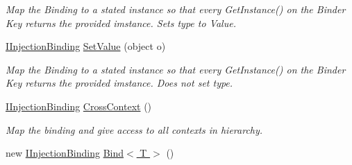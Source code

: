 \begin{DoxyCompactItemize}
\begin{DoxyCompactList}\small\item\em Map the Binding to a stated instance so that every {\ttfamily Get\-Instance()} on the Binder Key returns the provided imstance. Sets type to Value. \end{DoxyCompactList}\item 
\hypertarget{classstrange_1_1extensions_1_1injector_1_1impl_1_1_injection_binding_ad97ebc39c7c92c529732ee4f36ed6684}{\hyperlink{interfacestrange_1_1extensions_1_1injector_1_1api_1_1_i_injection_binding}{I\-Injection\-Binding} \hyperlink{classstrange_1_1extensions_1_1injector_1_1impl_1_1_injection_binding_ad97ebc39c7c92c529732ee4f36ed6684}{Set\-Value} (object o)}\label{classstrange_1_1extensions_1_1injector_1_1impl_1_1_injection_binding_ad97ebc39c7c92c529732ee4f36ed6684}

\begin{DoxyCompactList}\small\item\em Map the Binding to a stated instance so that every {\ttfamily Get\-Instance()} on the Binder Key returns the provided imstance. Does not set type. \end{DoxyCompactList}\item 
\hypertarget{classstrange_1_1extensions_1_1injector_1_1impl_1_1_injection_binding_abd9f222c9ad96768dd1cd9ce76d31f7b}{\hyperlink{interfacestrange_1_1extensions_1_1injector_1_1api_1_1_i_injection_binding}{I\-Injection\-Binding} \hyperlink{classstrange_1_1extensions_1_1injector_1_1impl_1_1_injection_binding_abd9f222c9ad96768dd1cd9ce76d31f7b}{Cross\-Context} ()}\label{classstrange_1_1extensions_1_1injector_1_1impl_1_1_injection_binding_abd9f222c9ad96768dd1cd9ce76d31f7b}

\begin{DoxyCompactList}\small\item\em Map the binding and give access to all contexts in hierarchy. \end{DoxyCompactList}\item 
\hypertarget{classstrange_1_1extensions_1_1injector_1_1impl_1_1_injection_binding_a3a9d05cf30a577586d33a5722c277b54}{new \hyperlink{interfacestrange_1_1extensions_1_1injector_1_1api_1_1_i_injection_binding}{I\-Injection\-Binding} \hyperlink{classstrange_1_1extensions_1_1injector_1_1impl_1_1_injection_binding_a3a9d05cf30a577586d33a5722c277b54}{Bind$<$ T $>$} ()}\label{classstrange_1_1extensions_1_1injector_1_1impl_1_1_injection_binding_a3a9d05cf30a577586d33a5722c277b54}


\end{DoxyCompactItemize}
